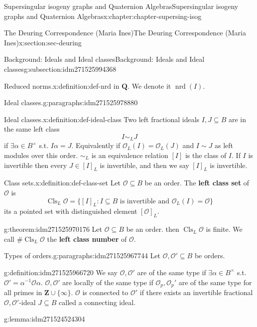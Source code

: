 \documentclass[oneside,10pt,]{book}
\newcommand{\terminology}[1]{\textbf{#1}}
\numberwithin{equation}{section}
\newcommand{\inv}{^{-1}}
\newcommand{\lb}{[}
\newcommand{\rb}{]}
\newcommand{\ZZ}{\mathbf{Z}}
\newcommand{\QQ}{\mathbf{Q}}
\newcommand{\ints}{\mathcal{O}}
\begin{document}
\begin{chapterptx}{Supersingular isogeny graphs and Quaternion Algebras}{}{Supersingular isogeny graphs and Quaternion Algebras}{}{}{x:chapter:chapter-supersing-isog}
\begin{sectionptx}{The Deuring Correspondence (Maria Ines)}{}{The Deuring Correspondence (Maria Ines)}{}{}{x:section:sec-deuring}
\begin{subsectionptx}{Background: Ideals and Ideal classes}{}{Background: Ideals and Ideal classes}{}{}{g:subsection:idm271525994368}
\begin{definition}{Reduced norms.}{x:definition:def-nrd}
in \(\QQ\). We denote it \(\operatorname{nrd}(I)\).%
\end{definition}
\begin{paragraphs}{Ideal classes.}{g:paragraphs:idm271525978880}%
\begin{definition}{Ideal classes.}{x:definition:def-ideal-class}%
Two left fractional ideals \(I,J \subseteq B\) are in the same left class%
\begin{equation*}
I\sim_L J
\end{equation*}
if \(\exists  \alpha \in B^\times\) s.t. \(I\alpha = J\). Equivalently if \(\ints_L(I)  = \ints_L(J)\) and \(I \sim J\) as left modules over this order. \(\sim_L\) is an equivalence relation \(\lb I \rb\) is the class of \(I\). If \(I \) is invertible then every \(J \in \lb I \rb_L\) is invertible, and then we say \(\lb I \rb_L \) is invertible.%
\end{definition}
\begin{definition}{Class sets.}{x:definition:def-class-set}%
Let \(\ints \subseteq B\) be an order. The \terminology{left class set} of \(\ints\) is%
\begin{equation*}
\operatorname{Cls}_L \ints   = \{ \lb I \rb_L : I \subseteq B \text{ is invertible  and } \ints_L(I) = \ints\}
\end{equation*}
its a pointed set with distinguished element \(\lb \ints \rb_L\).%
\end{definition}
\begin{theorem}{}{}{g:theorem:idm271525970176}%
Let \(\ints \subseteq B\) be an order. then \(\operatorname{Cls} _L \ints\) is finite. We call \(\# \operatorname{Cls}_L\ints \) the \terminology{left class number} of \(\ints\).%
\end{theorem}
\end{paragraphs}%
\begin{paragraphs}{Types of orders.}{g:paragraphs:idm271525967744}%
Let \(\ints ,\ints'  \subseteq B\) be orders.%
\begin{definition}{}{g:definition:idm271525966720}%
We say \(\ints,\ints' \) are of the same type if \(\exists \alpha \in B^\times\) s.t. \(\ints ' = \alpha \inv \ints \alpha\). \(\ints,\ints'\) are locally of the same type if \(\ints_p, \ints_p'\) are of the same type for all primes in \(\ZZ\cup\{\infty\}\). \(\ints\) is connected to  \(\ints'\) if there exists an invertible fractional \(\ints,\ints'\)-ideal \(J \subseteq B\) called a connecting ideal.%
\end{definition}
\begin{lemma}{}{}{g:lemma:idm271524524304}%

\end{lemma}
\end{paragraphs}
\end{subsectionptx}
\end{sectionptx}
\end{chapterptx}
\end{document}
